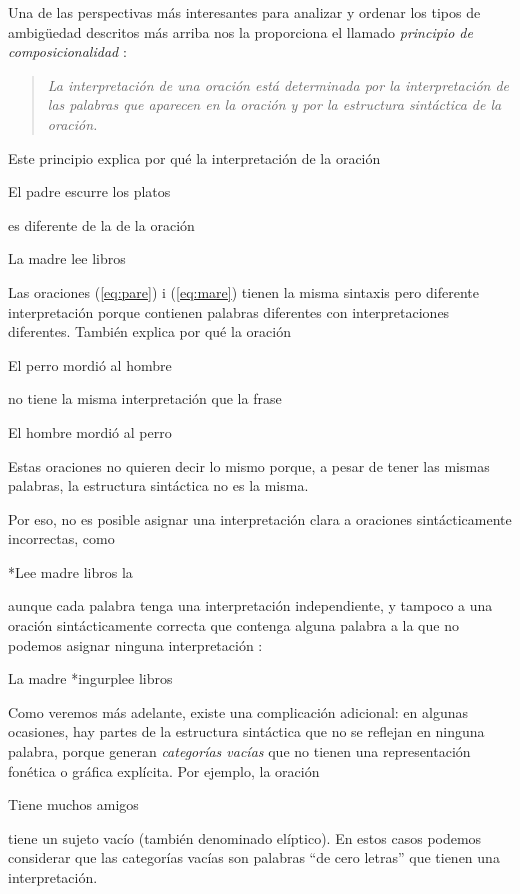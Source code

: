 Una de las perspectivas más interesantes para analizar y ordenar los tipos de ambigüedad descritos más arriba nos la proporciona el llamado \emph{principio de composicionalidad} \citep[cap.~23]{radford09b}: \begin{quote} {\sl La interpretación de una oración está determinada por la interpretación de las palabras que aparecen en la oración y por la estructura sintáctica de la oración.} \end{quote} Este principio explica por qué la interpretación de la oración \begin{exemple} \label{eq:pare} El padre escurre los platos \end{exemple} es diferente de la de la oración \begin{exemple} La madre lee libros \label{eq:mare} \end{exemple} Las oraciones (\ref{eq:pare}) i (\ref{eq:mare}) tienen la misma sintaxis pero diferente interpretación porque contienen palabras diferentes con interpretaciones diferentes. También explica por qué la oración \begin{exemple} El perro mordió al hombre \end{exemple} no tiene la misma interpretación que la frase \begin{exemple} El hombre mordió al perro \end{exemple} Estas oraciones no quieren decir lo mismo porque, a pesar de tener las mismas palabras, la estructura sintáctica no es la misma. 

Por eso, no es posible asignar una interpretación clara a oraciones sintácticamente incorrectas, como \begin{exemple} *Lee madre libros la \end{exemple} aunque cada palabra tenga una interpretación independiente, y tampoco a una oración sintácticamente correcta que contenga alguna palabra a la que no podemos asignar ninguna interpretación : \begin{exemple} La madre *ingurplee libros \end{exemple} Como veremos más adelante, existe una complicación adicional: en algunas ocasiones, hay partes de la estructura sintáctica que no se reflejan en ninguna palabra, porque generan \emph{categorías vacías} que no tienen una representación fonética o gráfica explícita. Por ejemplo, la oración \begin{exemple} Tiene muchos amigos \end{exemple} tiene un sujeto vacío (también denominado elíptico). En estos casos podemos considerar que las categorías vacías son palabras ``de cero letras'' que tienen una interpretación. 

